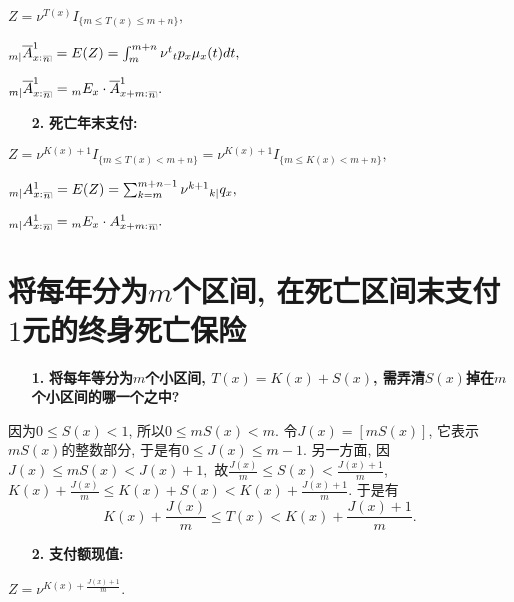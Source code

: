 \documentclass[a4paper,openany, 10pt]{ctexbook}
\makeatletter
\newcommand{\hei}{\CJKfamily{hei}}      %
\DeclareRobustCommand{\annu}[1]{_{%
    \def\arraystretch{0}%
    \setlength\arraycolsep{1pt}%
    \setlength\arrayrulewidth{.2pt}%
    \begin{array}[b]{@{}c|}\hline
        \\[\arraycolsep]%
        \scriptstyle #1%
    \end{array}%
}}
\makeatother
\begin{document}
$Z=\nu^{T(x)}I_{\{m\leq T(x)\leq m+n\}},$

${}_{m|}\overline{A}_{x:}^1{}_{\annu{n}}=E(Z)=\int_{m}^{m+n}\nu^{t}{}_{t}{p}_{x}\mu_{x}(t)dt,$

${}_{m|}\overline{A}_{x:}^1{}_{\annu{n}}={}_{m}{E}_{x}\cdot \overline{A}_{x+m:}^1{}_{\annu{n}}.$

\begin{itemize}
    \item[{\bf\hei 2.}]{\bf\hei 死亡年末支付: }
\end{itemize}

$Z=\nu^{K(x)+1}I_{\{m\leq T(x)<m+n\}}=\nu^{K(x)+1}I_{\{m\leq K(x)< m+n\}},$

${}_{m|}{A}_{x:}^1{}_{\annu{n}}=E(Z)=\sum_{k=m}^{m+n-1}\nu^{k+1}{}_{k|}{q}_{x},$

${}_{m|}{A}_{x:}^1{}_{\annu{n}}={}_{m}{E}_{x}\cdot {A}_{x+m:}^1{}_{\annu{n}}.$



\section{将每年分为$m$个区间, 在死亡区间末支付$1$元的终身死亡保险}

\begin{itemize}
    \item[{\bf\hei 1.}] {\bf\hei 将每年等分为$m$个小区间, $T(x)=K(x)+S(x)$, 需弄清$S(x)$掉在$m$个小区间的哪一个之中?}
\end{itemize}
因为$0 \leq S(x)<1$, 所以$0\leq mS(x)<m$. 令$J(x)=[mS(x)]$, 它表示$mS(x)$的整数部分, 于是有$0\leq J(x)\leq m-1$. 另一方面, 因$J(x)\leq mS(x)<J(x)+1,$ 故$\frac{J(x)}{m}\leq S(x)<\frac{J(x)+1}{m}$, $K(x)+\frac{J(x)}{m}\leq K(x)+S(x)< K(x)+\frac{J(x)+1}{m}$. 于是有
$$K(x)+\frac{J(x)}{m}\leq T(x)< K(x)+\frac{J(x)+1}{m}.$$



\begin{itemize}
    \item[{\bf\hei 2.}]{\bf\hei 支付额现值: }
\end{itemize}

$Z=\nu^{K(x)+\frac{J(x)+1}{m}}.$
\end{document}
